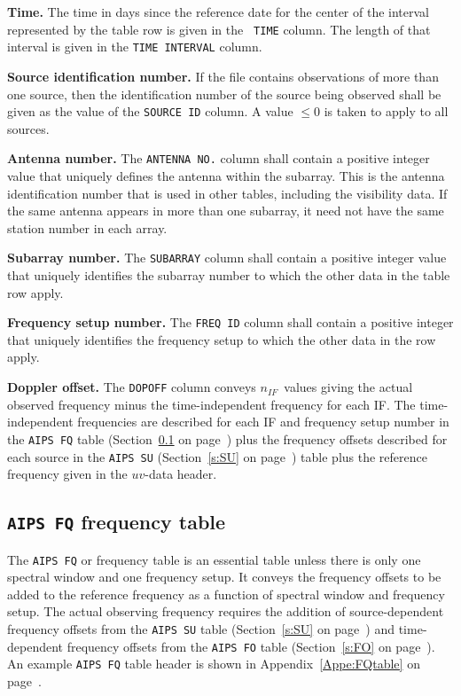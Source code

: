 \documentclass[twoside]{article}
\newcommand{\nif}{$n_{IF}$}
\begin{document}
{\bf Time.} The time in days since the reference date for the center
of the interval represented by the table row is given in the {\tt
  TIME} column.  The length of that interval is given in the {\tt TIME
  INTERVAL} column.

{\bf Source identification number.} If the file contains observations
of more than one source, then the identification number of the source
being observed shall be given as the value of the {\tt SOURCE ID}
column.  A value $\leq 0$ is taken to apply to all sources.

{\bf Antenna number.} The {\tt ANTENNA NO.} column shall contain a
positive integer value that uniquely defines the antenna within the
subarray.  This is the antenna identification number that is used in
other tables, including the visibility data. If the same antenna
appears in more than one subarray, it need not have the same station
number in each array.

{\bf Subarray number.} The {\tt SUBARRAY} column shall contain a
positive integer value that uniquely identifies the subarray number
to which the other data in the table row apply.

{\bf Frequency setup number.} The {\tt FREQ ID} column shall contain a
positive integer that uniquely identifies the frequency setup to which
the other data in the row apply.

{\bf Doppler offset.} The {\tt DOPOFF} column conveys \nif\ values
giving the actual observed frequency minus the time-independent
frequency for each IF.  The time-independent frequencies are described
for each IF and frequency setup number in the {\tt AIPS FQ} table
(Section~\ref{s:FQ} on page~\pageref{s:FQ}) plus the frequency offsets
described for each source in the {\tt AIPS SU} (Section~\ref{s:SU}
on page~\pageref{s:SU}) table plus the reference frequency given in
the $uv$-data header.

\subsection{{\tt AIPS FQ} frequency table}
\label{s:FQ}

The {\tt AIPS FQ} or frequency table is an essential table unless
there is only one spectral window and one frequency setup.  It conveys
the frequency offsets to be added to the reference frequency as a
function of spectral window and frequency setup.  The actual observing
frequency requires the addition of source-dependent frequency offsets
from the {\tt AIPS SU} table (Section~\ref{s:SU} on
page~\pageref{s:SU}) and time-dependent frequency offsets from the
{\tt AIPS FO} table (Section~\ref{s:FO} on page~\pageref{s:FO}).  An
example {\tt AIPS FQ} table header is shown in
Appendix~\ref{Appe:FQtable} on page~\pageref{Appe:FQtable}.
\end{document}
